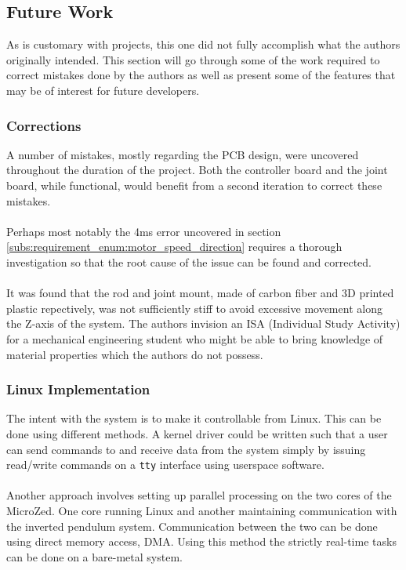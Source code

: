 \subsection{Future Work}
\label{sub:future_work}
As is customary with projects, this one did not fully accomplish what the authors originally intended.
This section will go through some of the work required to correct mistakes done by the authors as well as present some of the features that may be of interest for future developers.

\subsubsection{Corrections} %
\label{ssub:corrections}
A number of mistakes, mostly regarding the PCB design, were uncovered throughout the duration of the project.
Both the controller board and the joint board, while functional, would benefit from a second iteration to correct these mistakes.
\\~\\
Perhaps most notably the 4ms error uncovered in section \ref{subs:requirement_enum:motor_speed_direction} requires a thorough investigation so that the root cause of the issue can be found and corrected. 
\\~\\
It was found that the rod and joint mount, made of carbon fiber and 3D printed plastic repectively, was not sufficiently stiff to avoid excessive movement along the Z-axis of the system.
The authors invision an ISA (Individual Study Activity) for a mechanical engineering student who might be able to bring knowledge of material properties which the authors do not possess.
\subsubsection{Linux Implementation} %
\label{ssub:linux_implementation}
The intent with the system is to make it controllable from Linux.
This can be done using different methods.
A kernel driver could be written such that a user can send commands to and receive data from the system simply by issuing read/write commands on a \texttt{tty} interface using userspace software.
\\~\\
Another approach involves setting up parallel processing on the two cores of the MicroZed.
One core running Linux and another maintaining communication with the inverted pendulum system.
Communication between the two can be done using direct memory access, DMA.
Using this method the strictly real-time tasks can be done on a bare-metal system.
